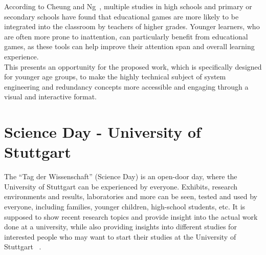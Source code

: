 According to Cheung and Ng~\cite{application-of-education-games-to-enhance-student-learning}, multiple studies in high schools and primary or secondary schools have found that educational
games are more likely to be integrated into the classroom by teachers of higher grades.
Younger learners, who are often more prone to inattention, can particularly benefit from
educational games, as these tools can help improve their attention span and overall learning experience.
\\
This presents an opportunity for the proposed work, which is specifically designed for younger age groups, to make the highly
technical subject of system engineering and redundancy concepts more accessible and engaging through a visual and interactive format.

\section{Science Day - University of Stuttgart}\label{sec:science-day---university-of-stuttgart}
The ``Tag der Wissenschaft'' (Science Day) is an open-door day, where the University of Stuttgart can be experienced by everyone.
Exhibits, research environments and results, laboratories and more can be seen, tested and used by everyone, including families, younger children,
high-school students, etc.
It is supposed to show recent research topics and provide insight into the actual work done at a university, while also providing insights
into different studies for interested people who may want to start their studies at the University of Stuttgart ~\cite{tag-der-wissenschaft}.